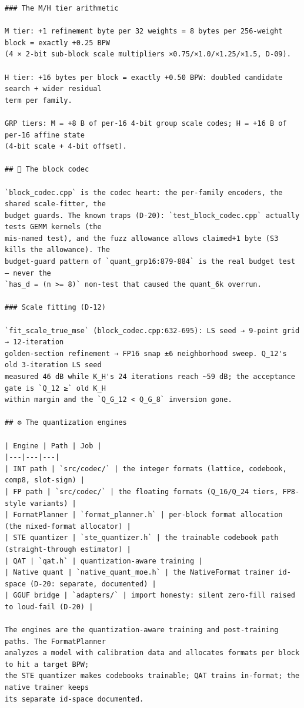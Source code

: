 \begin{Verbatim}[breaklines,breakanywhere,fontsize=\footnotesize]
### The M/H tier arithmetic

M tier: +1 refinement byte per 32 weights = 8 bytes per 256-weight block = exactly +0.25 BPW
(4 × 2-bit sub-block scale multipliers ×0.75/×1.0/×1.25/×1.5, D-09).

H tier: +16 bytes per block = exactly +0.50 BPW: doubled candidate search + wider residual
term per family.

GRP tiers: M = +8 B of per-16 4-bit group scale codes; H = +16 B of per-16 affine state
(4-bit scale + 4-bit offset).

## 🧱 The block codec

`block_codec.cpp` is the codec heart: the per-family encoders, the shared scale-fitter, the
budget guards. The known traps (D-20): `test_block_codec.cpp` actually tests GEMM kernels (the
mis-named test), and the fuzz allowance allows claimed+1 byte (S3 kills the allowance). The
budget-guard pattern of `quant_grp16:879-884` is the real budget test — never the
`has_d = (n >= 8)` non-test that caused the quant_6k overrun.

### Scale fitting (D-12)

`fit_scale_true_mse` (block_codec.cpp:632-695): LS seed → 9-point grid → 12-iteration
golden-section refinement → FP16 snap ±6 neighborhood sweep. Q_12's old 3-iteration LS seed
measured 46 dB while K_H's 24 iterations reach ~59 dB; the acceptance gate is `Q_12 ≥` old K_H
within margin and the `Q_G_12 < Q_G_8` inversion gone.

## ⚙️ The quantization engines

| Engine | Path | Job |
|---|---|---|
| INT path | `src/codec/` | the integer formats (lattice, codebook, comp8, slot-sign) |
| FP path | `src/codec/` | the floating formats (Q_16/Q_24 tiers, FP8-style variants) |
| FormatPlanner | `format_planner.h` | per-block format allocation (the mixed-format allocator) |
| STE quantizer | `ste_quantizer.h` | the trainable codebook path (straight-through estimator) |
| QAT | `qat.h` | quantization-aware training |
| Native quant | `native_quant_moe.h` | the NativeFormat trainer id-space (D-20: separate, documented) |
| GGUF bridge | `adapters/` | import honesty: silent zero-fill raised to loud-fail (D-20) |

The engines are the quantization-aware training and post-training paths. The FormatPlanner
analyzes a model with calibration data and allocates formats per block to hit a target BPW;
the STE quantizer makes codebooks trainable; QAT trains in-format; the native trainer keeps
its separate id-space documented.


\end{Verbatim}
